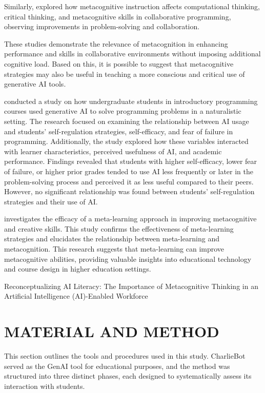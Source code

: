 \documentclass[a4paper,twoside]{article}
\begin{document}
Similarly, \cite{Wang23} explored how metacognitive instruction affects
computational thinking, critical thinking, and metacognitive skills in
collaborative programming, observing improvements in problem-solving and
collaboration.

These studies demonstrate the relevance of metacognition in enhancing
performance and skills in collaborative environments without imposing additional
cognitive load. Based on this, it is possible to suggest that metacognitive
strategies may also be useful in teaching a more conscious and critical use of
generative AI tools.

\cite{Margulieux24} conducted a study on how undergraduate students in
introductory programming courses used generative AI to solve programming
problems in a naturalistic setting. The research focused on examining the
relationship between AI usage and students’ self-regulation strategies,
self-efficacy, and fear of failure in programming. Additionally, the study
explored how these variables interacted with learner characteristics, perceived
usefulness of AI, and academic performance. Findings revealed that students
with higher self-efficacy, lower fear of failure, or higher prior grades
tended to use AI less frequently or later in the problem-solving process and
perceived it as less useful compared to their peers. However, no significant
relationship was found between students’ self-regulation strategies and their
use of AI.

\cite{Khusnul24} investigates the efficacy of a meta-learning approach in
improving metacognitive and creative skills. This study confirms the
effectiveness of meta-learning strategies and elucidates the relationship
between meta-learning and metacognition. This research suggests that
meta-learning can improve metacognitive abilities, providing valuable insights
into educational technology and course design in higher education settings.

Reconceptualizing AI Literacy: The Importance of Metacognitive Thinking in an Artificial Intelligence (AI)-Enabled Workforce

\section{\uppercase{Material and Method}}

This section outlines the tools and procedures used in this study. CharlieBot
served as the GenAI tool for educational purposes, and the method was structured
into three distinct phases, each designed to systematically assess its
interaction with students.
\end{document}
